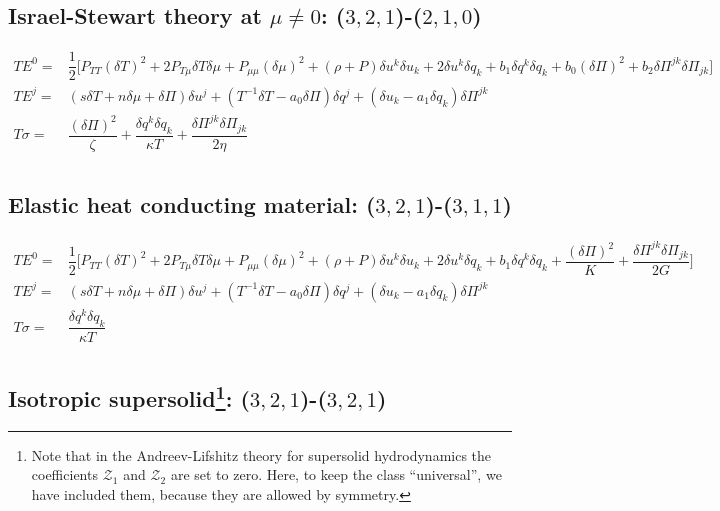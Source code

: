 \documentclass[aps,prl,singlecolumn,nofootinbib]{revtex4-2}
\theoremstyle{definition}
\theoremstyle{theorem}
\begin{document}
\subsection*{Israel-Stewart theory at $\mu \neq 0$: ($3,2,1$)-($2, 1,0$)}

\begin{equation}
\begin{split}
TE^0={}& \dfrac{1}{2} \bigg[P_{TT} (\delta T)^2 +2 P_{T\mu} \delta T \delta \mu + P_{\mu \mu} (\delta \mu)^2  + (\rho{+}P) \delta u^k \delta u_k + 2 \delta u^k \delta q_k + b_1 \delta q^k \delta q_k +b_0 (\delta \Pi)^2 + b_2 \delta \Pi^{jk} \delta \Pi_{jk} \bigg] \\
TE^j={}& (s\delta T+ n\delta \mu +\delta \Pi)\delta u^j +(T^{-1} \delta T -a_0 \delta \Pi)\delta q^j + ( \delta u_k -a_1 \delta q_k)\delta \Pi^{jk}  \\
T\sigma ={}&  \dfrac{(\delta \Pi)^2}{\zeta} + \dfrac{\delta q^k \delta q_k}{\kappa T} +\dfrac{\delta \Pi^{jk} \delta \Pi_{jk}}{2\eta}  \\
\end{split}
\end{equation}


\subsection*{Elastic heat conducting material: ($3,2,1$)-($3, 1,1$)}
\begin{equation}
\begin{split}
TE^0={}& \dfrac{1}{2} \bigg[P_{TT} (\delta T)^2 +2 P_{T\mu} \delta T \delta \mu + P_{\mu \mu} (\delta \mu)^2   + (\rho{+}P) \delta u^k \delta u_k + 2 \delta u^k \delta q_k + b_1 \delta q^k \delta q_k + \dfrac{(\delta \Pi)^2}{K}+ \dfrac{\delta \Pi^{jk} \delta \Pi_{jk}}{2G} \bigg]   \\
TE^j={}& (s\delta T +n\delta \mu+ \delta \Pi)\delta u^j +(T^{-1} \delta T -a_0 \delta \Pi)\delta q^j + ( \delta u_k -a_1 \delta q_k)\delta \Pi^{jk}   \\
T\sigma ={}&  \dfrac{\delta q^k \delta q_k}{\kappa T}  \\
\end{split}
\end{equation}

\subsection*{Isotropic supersolid\footnote{Note that in the Andreev-Lifshitz theory for supersolid hydrodynamics \cite{Andreev1969,Sears2010} the coefficients $\mathcal{Z}_1$ and $\mathcal{Z}_2$ are set to zero. Here, to keep the class ``universal'', we have included them, because they are allowed by symmetry.}: ($3,2,1$)-($3, 2,1$)}
\end{document}

